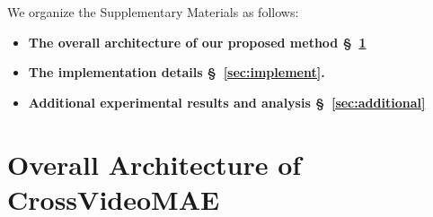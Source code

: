 \clearpage
\setcounter{page}{1}
\maketitlesupplementary

\setcounter{section}{0}
\setcounter{figure}{0}   
\setcounter{table}{0}   
\renewcommand{\thesection}{\Alph{section}}

\noindent We organize the Supplementary Materials as follows:


\begingroup
\begin{itemize}
\item \textbf{The overall architecture of our proposed method \S~\ref{sec:overall}}
\item \textbf{The implementation details \S~\ref{sec:implement}.}
\item \textbf{Additional experimental results and analysis \S~\ref{sec:additional} }
\end{itemize}
\endgroup


\section{Overall Architecture of CrossVideoMAE}
\label{sec:overall}

